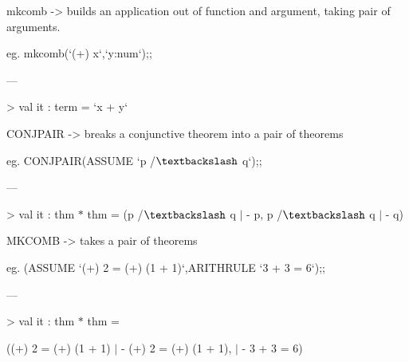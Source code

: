 \documentclass[12pt]{article}
\renewcommand{\_}{\kern-1.5pt\textunderscore\kern-1.5pt}
\begin{document}
\vspace{\baselineskip}
{\fontsize{13pt}{15.6pt}\selectfont mk\_comb -> builds an application out of function and argument, taking pair of arguments.\par}\par

{\fontsize{13pt}{15.6pt}\selectfont eg. mk\_comb(`(+) x`,`y:num`);;\par}\par

{\fontsize{14pt}{16.8pt}\selectfont —{\fontsize{13pt}{15.6pt}\selectfont > val it : term = `x + y`\par}\par}\par


\vspace{\baselineskip}
{\fontsize{13pt}{15.6pt}\selectfont CONJ\_PAIR -> breaks a conjunctive theorem into a pair of theorems\par}\par

{\fontsize{13pt}{15.6pt}\selectfont eg. CONJ\_PAIR(ASSUME `p /$\textbackslash$  q`);;\par}\par

{\fontsize{14pt}{16.8pt}\selectfont —{\fontsize{13pt}{15.6pt}\selectfont > val it : thm $\ast$  thm = (p /$\textbackslash$  q $ \vert $ - p, p /$\textbackslash$  q $ \vert $ - q)\par}\par}\par


\vspace{\baselineskip}
{\fontsize{13pt}{15.6pt}\selectfont MK\_COMB -> takes a pair of theorems\par}\par

{\fontsize{13pt}{15.6pt}\selectfont eg. (ASSUME `(+) 2 = (+) (1 + 1)`,ARITH\_RULE `3 + 3 = 6`);;\par}\par

{\fontsize{14pt}{16.8pt}\selectfont —{\fontsize{13pt}{15.6pt}\selectfont > val it : thm $\ast$  thm =\par}\par}\par

{\fontsize{13pt}{15.6pt}\selectfont ((+) 2 = (+) (1 + 1) $ \vert $ - (+) 2 = (+) (1 + 1), $ \vert $ - 3 + 3 = 6)\par}\par
\end{document}
